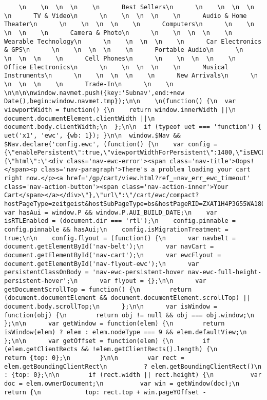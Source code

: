 \documentclass[
]{article}
\begin{document}
\begin{verbatim}
    \n    \n  \n  \n    \n      Best Sellers\n      \n    \n  \n  \n    \n      TV & Video\n      \n    \n  \n  \n    \n      Audio & Home Theater\n      \n    \n  \n  \n    \n      Computers\n      \n    \n  \n  \n    \n      Camera & Photo\n      \n    \n  \n  \n    \n      Wearable Technology\n      \n    \n  \n  \n    \n      Car Electronics & GPS\n      \n    \n  \n  \n    \n      Portable Audio\n      \n    \n  \n  \n    \n      Cell Phones\n      \n    \n  \n  \n    \n      Office Electronics\n      \n    \n  \n  \n    \n      Musical Instruments\n      \n    \n  \n  \n    \n      New Arrivals\n      \n    \n  \n  \n    \n      Trade-In\n      \n    \n  \n\n\n\nwindow.navmet.push({key:'Subnav',end:+new Date(),begin:window.navmet.tmp});\n\n    \n(function() {\n  var viewportWidth = function() {\n    return window.innerWidth ||\n      document.documentElement.clientWidth ||\n      document.body.clientWidth;\n  };\n\n  if (typeof uet === 'function') {  uet('x1', 'ewc', {wb: 1}); }\n\n  window.$Nav && $Nav.declare('config.ewc', (function() {\n    var config = {\"enablePersistent\":true,\"viewportWidthForPersistent\":1400,\"isEWCLogging\":1,\"isEWCStateExpanded\":true,\"EWCStateReason\":\"fixed\",\"isSmallScreenEnabled\":true,\"isFreshCustomer\":false,\"errorContent\":{\"html\":\"<div class='nav-ewc-error'><span class='nav-title'>Oops!</span><p class='nav-paragraph'>There's a problem loading your cart right now.</p><a href='/gp/cart/view.html?ref_=nav_err_ewc_timeout' class='nav-action-button'><span class='nav-action-inner'>Your Cart</span></a></div>\"},\"url\":\"/cart/ewc/compact?hostPageType=zeitgeist&hostSubPageType=bs&hostPageRID=ZXAT1H4P3G55WA180GEF&prerender=0&storeName=electronics\",\"cartCount\":0,\"freshCartCount\":0,\"almCartCount\":0,\"primeWardrobeCartCount\":0,\"isCompactViewEnabled\":true,\"isCompactEWCRendered\":true,\"isWiderCompactEWCRendered\":true};\n    var hasAui = window.P && window.P.AUI_BUILD_DATE;\n    var isRTLEnabled = (document.dir === 'rtl');\n    config.pinnable = config.pinnable && hasAui;\n    config.isMigrationTreatment = true;\n\n    config.flyout = (function() {\n      var navbelt = document.getElementById('nav-belt');\n      var navCart = document.getElementById('nav-cart');\n      var ewcFlyout = document.getElementById('nav-flyout-ewc');\n      var persistentClassOnBody = 'nav-ewc-persistent-hover nav-ewc-full-height-persistent-hover';\n      var flyout = {};\n\n      var getDocumentScrollTop = function() {\n        return (document.documentElement && document.documentElement.scrollTop) || document.body.scrollTop;\n      };\n\n      var isWindow = function(obj) {\n        return obj != null && obj === obj.window;\n      };\n\n      var getWindow = function(elem) {\n        return isWindow(elem) ? elem : elem.nodeType === 9 && elem.defaultView;\n      };\n\n      var getOffset = function(elem) {\n        if (elem.getClientRects && !elem.getClientRects().length) {\n          return {top: 0};\n        }\n\n        var rect = elem.getBoundingClientRect\n          ? elem.getBoundingClientRect()\n          : {top: 0};\n\n        if (rect.width || rect.height) {\n          var doc = elem.ownerDocument;\n          var win = getWindow(doc);\n          return {\n            top: rect.top + win.pageYOffset - 
\end{verbatim}
\end{document}
